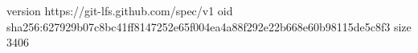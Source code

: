 version https://git-lfs.github.com/spec/v1
oid sha256:627929b07c8bc41ff8147252e65f004ea4a88f292e22b668e60b98115de5c8f3
size 3406
